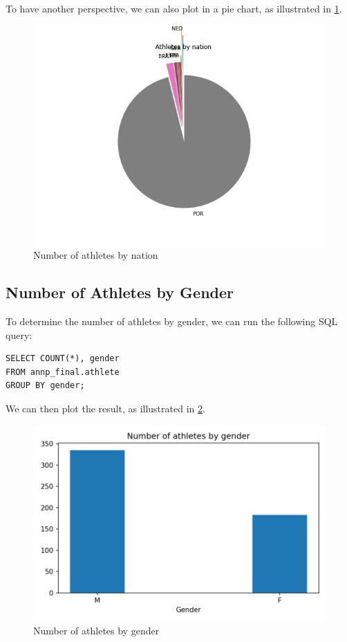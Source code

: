 To have another perspective, we can also plot in a pie chart, as illustrated in \cref{fig:athletesbynation-pie}.

\begin{figure}[H]
    \centering
    \includegraphics[width=.8\textwidth]{img/athletesbynation-piechart}
    \caption{Number of athletes by nation}
    \label{fig:athletesbynation-pie}
\end{figure}

\subsection{Number of Athletes by Gender}\label{subsec:number-of-athletes-by-gender}

To determine the number of athletes by gender, we can run the following SQL query:

\begin{verbatim}
SELECT COUNT(*), gender
FROM annp_final.athlete
GROUP BY gender;
\end{verbatim}

We can then plot the result, as illustrated in \cref{fig:athletesbygender}.

\begin{figure}[H]
    \centering
    \includegraphics[width=.35\textwidth]{img/athletesbygender}
    \caption{Number of athletes by gender}
    \label{fig:athletesbygender}
\end{figure}

